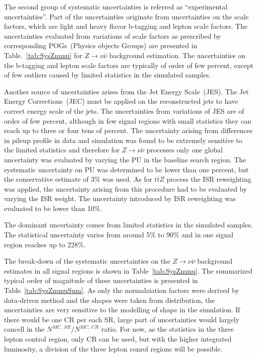 The second group of systematic uncertainties is referred as ``experimental uncertainties''. Part of the uncertainties originate from uncertainties on the scale factors, which are light and heavy flavor b-tagging and lepton scale factors. The uncertainties evaluated from variations of scale factors as prescribed by corresponding POGs~(Physics objects Groups) are presented in Table.~\ref{tab:SysZnunu} for $Z \to \nu \bar{\nu}$ background estimation. The uncertainties on the b-tagging and lepton scale factors are typically of order of few percent, except of few outliers caused by limited statistics in the simulated samples.

Another source of uncertainties arises from the Jet Energy Scale~(JES). The Jet Energy Corrections~(JEC) must be applied on the reconstructed jets to have correct energy scale of the jets. The uncertainties from variations of JES are of order of few percent, although in few signal regions with small statistics they can reach up to three or four tens of percent. The uncertainty arising from differences in pileup profile in data and simulation was found to be extremely sensitive to the limited statistics and therefore for $Z \to  \nu \bar{\nu}$ processes only one global uncertainty was evaluated by varying the PU in the baseline search region. The systematic uncertainty on PU was determined to be lower than one percent, but the conservative estimate of 3\% was used. As for $t\bar{t}Z$ process the ISR reweighting was applied, the uncertainty arising from this procedure had to be evaluated by varying the ISR weight. The uncertainty introduced by ISR reweighting was evaluated to be lower than 10\%.

The dominant uncertainty comes from limited statistics in the simulated samples. The statistical uncertainty varies from around 5\% to 90\% and in one signal region reaches up to 228\%.

The break-down of the systematic uncertainties on the $Z \to \nu \bar{\nu}$  background estimates in all signal regions is shown in Table~\ref{tab:SysZnunu}. The summarized typical order of magnitude of these uncertainties is presented in Table~\ref{tab:SysZnunuSum}. As only the normalziation factors were derived by data-driven method and the shapes were taken from distribution, the uncertainties are very sensitive to the modelling of shape in the simulation. If there would be one CR per each SR, large part of uncertainties would largely cancell in the $N^{MC,~SR}/ N^{MC,~CR}$ ratio. For now, as the statistics in the three lepton control region, only CR can be used, but with the higher integrated luminosity, a division of the three lepton conrol regions will be possible.

